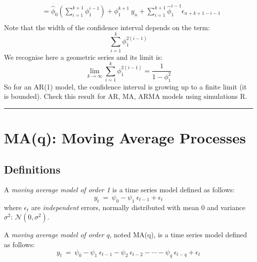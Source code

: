\documentclass[a4paper,11pt,oneside,onecolumn]{book}
\begin{document}
\begin{enumerate}
$$\begin{array}{ll}
&=\hat{\phi}_0 \left( \sum_{i=1}^{k+1} \phi_1^{i-1} \right)+\phi_1^{k+1} \ y_n + \sum_{i=1}^{k+1} \hat{\phi}_1^{i-1} \epsilon_{n+k+1-i-1}\\
\end{array}
$$
Note that the width of the confidence interval depends on the term:
$$
\sum_{i=1}^{k} \phi_1^{2(i-1)}
$$
We recognise here a geometric series and its limit is:
$$
\lim_{k\rightarrow \infty} \sum_{i=1}^{k} \phi_1^{2(i-1)}=\frac{1}{1-\phi_1^{2}}
$$
So for an AR(1) model, the confidence interval is growing up to a finite limit (it is bounded). Check this result for AR, MA, ARMA models using simulations R. 

\vspace{.5cm}
\end{enumerate}

\noindent\rule[.15 cm]{\linewidth}{.01 cm}



\chapter{MA(q): Moving Average Processes}
\label{chp:MA}

\section{Definitions}

\begin{definition}
\noindent A {\it moving average model of order 1} is a time series
model defined as follows:
\[ y_t \: = \: \psi_0  - \psi_1\ \epsilon_{t-1} + \epsilon_t  \]
where $\epsilon_t$ are {\it independent} errors, normally distributed with
mean 0 and variance $\sigma^2$: $\mathcal{N}(0,\sigma^2)$.
\end{definition}

\begin{definition}
  A {\it moving average model of order $q$}, noted MA(q), is
a time series model defined as follows:
\[ y_t \: = \: \psi_0 - \psi_1\ \epsilon_{t-1} - \psi_2\ \epsilon_{t-2} - \cdots - \psi_q\ \epsilon_{t-q}  + \epsilon_t \]
\end{definition}
\end{document}
